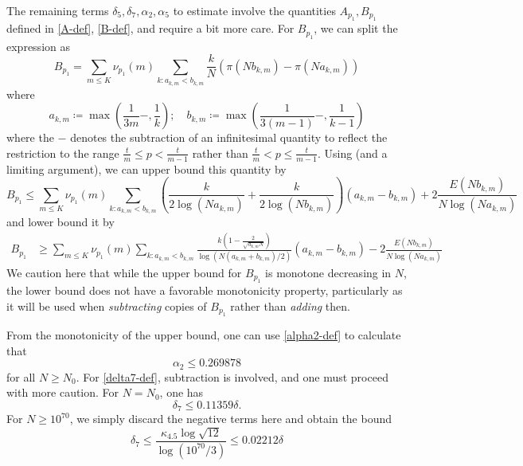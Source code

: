 \documentclass[12pt,a4paper,reqno]{amsart}
\numberwithin{equation}{section}
\theoremstyle{plain}
\theoremstyle{definition}
\begin{document}
The remaining terms $\delta_5, \delta_7, \alpha_2, \alpha_5$ to estimate involve the quantities $A_{p_1}, B_{p_1}$ defined in \eqref{A-def}, \eqref{B-def}, and require a bit more care.  For $B_{p_1}$, we can split the expression as
$$ B_{p_1} = \sum_{m \leq K} \nu_{p_1}(m) \sum_{k: a_{k,m} < b_{k,m}} \frac{k}{N} (\pi( N b_{k,m} ) - \pi(N a_{k,m}))$$
where 
$$ a_{k,m} \coloneqq \max\left( \frac{1}{3m}-, \frac{1}{k} \right); \quad b_{k,m} \coloneqq \max\left( \frac{1}{3(m-1)}-, \frac{1}{k-1} \right)$$
where the $-$ denotes the subtraction of an infinitesimal quantity to reflect the restriction to the range $\frac{t}{m} \leq p < \frac{t}{m-1}$ rather than
$\frac{t}{m} < p \leq \frac{t}{m-1}$.  Using  (and a limiting argument), we can upper bound this quantity by
$$ B_{p_1} \leq \sum_{m \leq K} \nu_{p_1}(m) \sum_{k: a_{k,m} < b_{k,m}} \left(\frac{k}{2\log(N a_{k,m})}+\frac{k}{2\log(N b_{k,m})}\right) (a_{k,m}-b_{k,m}) + 2\frac{E(N b_{k,m})}{N \log(N a_{k,m})} $$
and lower bound it by
\begin{align*}
   B_{p_1} &\geq \sum_{m \leq K} \nu_{p_1}(m) \sum_{k: a_{k,m} < b_{k,m}} \frac{k\left(1-\frac{2}{\sqrt{a_{k,m} N}}\right)}{\log(N (a_{k,m}+b_{k,m})/2)}  (a_{k,m}-b_{k,m}) - 2\frac{E(N b_{k,m})}{N \log(N a_{k,m})}
\end{align*}
We caution here that while the upper bound for $B_{p_1}$ is monotone decreasing in $N$, the lower bound does not have a favorable monotonicity property, particularly as it will be used when \emph{subtracting} copies of $B_{p_1}$ rather than \emph{adding} then.

From the monotonicity of the upper bound, one can use \eqref{alpha2-def} to calculate that 
$$ \alpha_2 \leq 0.269878$$
for all $N \geq N_0$.  For \eqref{delta7-def}, subtraction is involved, and one must proceed with more caution.  For $N=N_0$, one has
$$ \delta_7 \leq 0.11359 \delta.$$
For $N \geq 10^{70}$, we simply discard the negative terms here and obtain the bound
$$ \delta_7 \leq \frac{\kappa_{4.5} \log \sqrt{12}}{\log(10^{70}/3)}  \leq 0.02212 \delta$$
\end{document}
